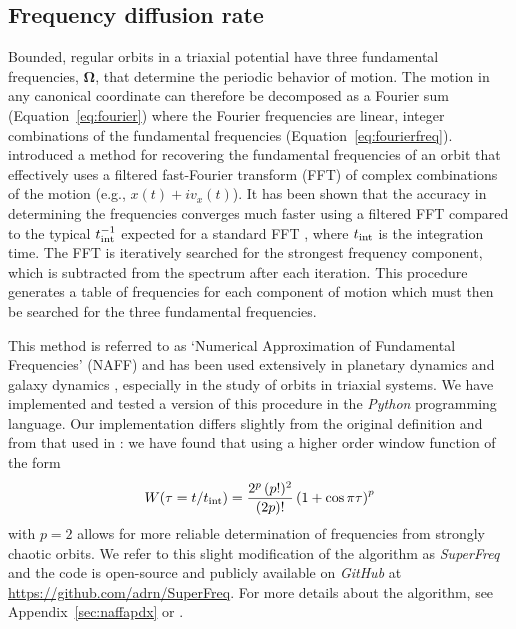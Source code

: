 \documentclass[letterpaper,12pt,preprint]{aastex}
\newcommand{\bs}[1]{\boldsymbol{#1}}
\newcommand{\inttime}{t_{\rm int}}
\newcommand{\project}[1]{\textsl{#1}}
\newcommand{\superfreq}{\project{SuperFreq}}
\begin{document}
\subsection{Frequency diffusion rate}\label{sec:naff}

Bounded, regular orbits in a triaxial potential have three fundamental frequencies, $\bs{\Omega}$, that determine the periodic behavior of motion. The motion in any canonical coordinate can therefore be decomposed as a Fourier sum (Equation~\ref{eq:fourier}) where the Fourier frequencies are linear, integer combinations of the fundamental frequencies (Equation~\ref{eq:fourierfreq}). \cite{laskar93} introduced a method for recovering the fundamental frequencies of an orbit that effectively uses a filtered fast-Fourier transform (FFT) of complex combinations of the motion (e.g., $x(t) + i v_x(t)$). It has been shown that the accuracy in determining the frequencies converges much faster using a filtered FFT compared to the typical $\inttime^{-1}$ expected for a standard FFT \citep{laskar99}, where $\inttime$ is the integration time. The FFT is iteratively searched for the strongest frequency component, which is subtracted from the spectrum after each iteration. This procedure generates a table of frequencies for each component of motion which must then be searched for the three fundamental frequencies.

This method is referred to as `Numerical Approximation of Fundamental Frequencies' (NAFF) and has been used extensively in planetary dynamics \citep[e.g.,][]{laskar93b, laskar96} and galaxy dynamics \citep{papaphilippou98, valluri98}, especially in the study of orbits in triaxial systems. We have implemented and tested a version of this procedure in the \project{Python} programming language. Our implementation differs slightly from the original definition and from that used in \cite{valluri98}: we have found that using a higher order window function \citep[e.g.,][]{hunter02} of the form
\begin{equation}
	W(\tau=t/\inttime) = \frac{2^p \, (p!)^2}{(2p)!} \left( 1 + \cos \pi \tau\right)^p
\end{equation}
with $p=2$ allows for more reliable determination of frequencies from strongly chaotic orbits. We refer to this slight modification of the algorithm as \superfreq\ \citep{superfreq} and the code is open-source and publicly available on \project{GitHub} at \url{https://github.com/adrn/SuperFreq}. For more details about the algorithm, see Appendix~\ref{sec:naffapdx} or \cite{laskar88, laskar93, papaphilippou96}.
\end{document}
